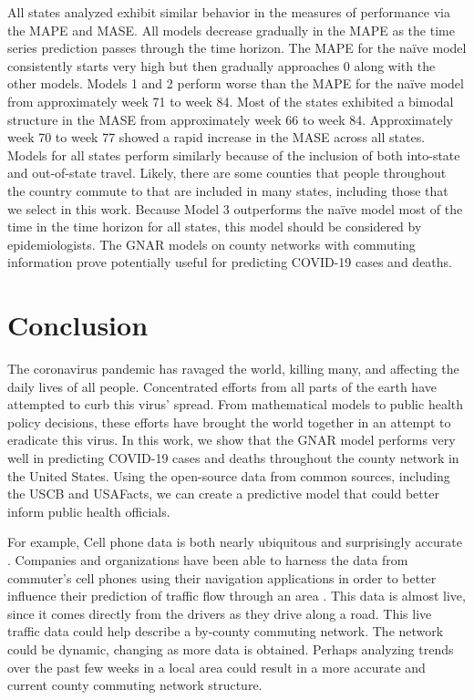 All states analyzed exhibit similar behavior in the measures of performance via the {MAPE} and {MASE}. All models decrease gradually in the {MAPE} as the time series prediction passes through the time horizon. The {MAPE} for the na\"ive model consistently starts very high but then gradually approaches 0 along with the other models. Models 1 and 2 perform worse than the {MAPE} for the na\"ive model from approximately week 71 to week 84. Most of the states exhibited a bimodal structure in the {MASE} from approximately week 66 to week 84. Approximately week 70 to week 77 showed a rapid increase in the {MASE} across all states. Models for all states perform similarly because of the inclusion of both into-state and out-of-state travel. Likely, there are some counties that people throughout the country commute to that are included in many states, including those that we select in this work. Because Model 3 outperforms the na\"ive model most of the time in the time horizon for all states, this model should be considered by epidemiologists. The {GNAR} models on county networks with commuting information prove potentially useful for predicting {COVID-19} cases and deaths. 


\section{Conclusion}
\label{sec:conclusion}

The coronavirus pandemic has ravaged the world, killing many, and affecting the daily lives of all people. Concentrated efforts from all parts of the earth have attempted to curb this virus' spread. From mathematical models to public health policy decisions, these efforts have brought the world together in an attempt to eradicate this virus. 
In this work, we show that the {GNAR} model performs very well in predicting {COVID-19} cases and deaths throughout the county network in the United States. Using the open-source data from common sources, including the {USCB} and {USAFacts}, we can create a predictive model that could better inform public health officials. 

For example, Cell phone data is both nearly ubiquitous and surprisingly accurate \cite{Johnson:2021}. Companies and organizations have been able to harness the data from commuter's cell phones using their navigation applications in order to better influence their prediction of traffic flow through an area \cite{Johnson:2021}. This data is almost live, since it comes directly from the drivers as they drive along a road.
This live traffic data could help describe a by-county commuting network. The network could be dynamic, changing as more data is obtained. Perhaps analyzing trends over the past few weeks in a local area could result in a more accurate and current county commuting network structure.

